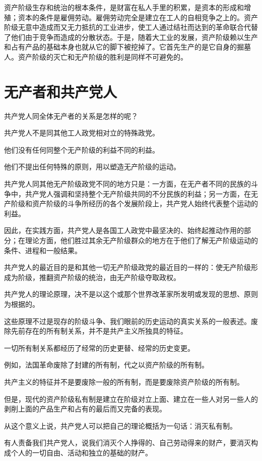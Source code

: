 \documentclass[10pt, UTF8]{book} %
\begin{document}
资产阶级生存和统治的根本条件，是财富在私人手里的积累，是资本的形成和增殖；资本的条件是雇佣劳动。雇佣劳动完全是建立在工人的自相竞争之上的。资产阶级无意中造成而又无力抵抗的工业进步，使工人通过结社而达到的革命联合代替了他们由于竞争而造成的分散状态。于是，随着大工业的发展，资产阶级赖以生产和占有产品的基础本身也就从它的脚下被挖掉了。它首先生产的是它自身的掘墓人。资产阶级的灭亡和无产阶级的胜利是同样不可避免的。

\section{无产者和共产党人}

共产党人同全体无产者的关系是怎样的呢？

共产党人不是同其他工人政党相对立的特殊政党。

他们没有任何同整个无产阶级的利益不同的利益。

他们不提出任何特殊的原则，用以塑造无产阶级的运动。

共产党人同其他无产阶级政党不同的地方只是：一方面，在无产者不同的民族的斗争中，共产党人强调和坚持整个无产阶级共同的不分民族的利益；另一方面，在无产阶级和资产阶级的斗争所经历的各个发展阶段上，共产党人始终代表整个运动的利益。

因此，在实践方面，共产党人是各国工人政党中最坚决的、始终起推动作用的部分；在理论方面，他们胜过其余无产阶级群众的地方在于他们了解无产阶级运动的条件、进程和一般结果。

共产党人的最近目的是和其他一切无产阶级政党的最近目的一样的：使无产阶级形成为阶级，推翻资产阶级的统治，由无产阶级夺取政权。

共产党人的理论原理，决不是以这个或那个世界改革家所发明或发现的思想、原则为根据的。

这些原理不过是现存的阶级斗争、我们眼前的历史运动的真实关系的一般表述。废除先前存在的所有制关系，并不是共产主义所独具的特征。

一切所有制关系都经历了经常的历史更替、经常的历史变更。

例如，法国革命废除了封建的所有制，代之以资产阶级的所有制。

共产主义的特征并不是要废除一般的所有制，而是要废除资产阶级的所有制。

但是，现代的资产阶级私有制是建立在阶级对立上面、建立在一些人对另一些人的剥削上面的产品生产和占有的最后而又完备的表现。

从这个意义上说，共产党人可以把自己的理论概括为一句话：消灭私有制。

有人责备我们共产党人，说我们消灭个人挣得的、自己劳动得来的财产，要消灭构成个人的一切自由、活动和独立的基础的财产。
\end{document}
